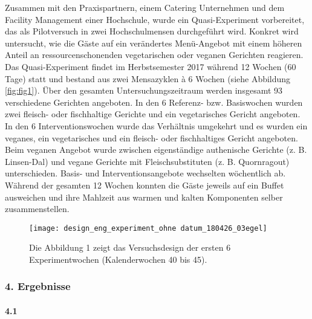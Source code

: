 \documentclass[12pt,ngerman,]{article}
\let\oldparagraph\paragraph
\renewcommand{\paragraph}[1]{\oldparagraph{#1}\mbox{}}
\begin{document}
Zusammen mit den Praxispartnern, einem Catering Unternehmen und dem
Facility Management einer Hochschule, wurde ein Quasi-Experiment
vorbereitet, das als Pilotversuch in zwei Hochschulmensen durchgeführt
wird. Konkret wird untersucht, wie die Gäste auf ein verändertes
Menü-Angebot mit einem höheren Anteil an ressourcenschonenden
vegetarischen oder veganen Gerichten reagieren. Das Quasi-Experiment
findet im Herbstsemester 2017 während 12 Wochen (60 Tage) statt und
bestand aus zwei Mensazyklen à 6 Wochen (siehe Abbildung
\ref{fig:fig1}). Über den gesamten Untersuchungszeitraum werden
insgesamt 93 verschiedene Gerichten angeboten. In den 6 Referenz- bzw.
Basiswochen wurden zwei fleisch- oder fischhaltige Gerichte und ein
vegetarisches Gericht angeboten. In den 6 Interventionswochen wurde das
Verhältnis umgekehrt und es wurden ein veganes, ein vegetarisches und
ein fleisch- oder fischhaltiges Gericht angeboten. Beim veganen Angebot
wurde zwischen eigenständige authenische Gerichte (z. B. Linsen-Dal) und
vegane Gerichte mit Fleischsubstituten (z. B. Quornragout)
unterschieden. Basis- und Interventionsangebote wechselten wöchentlich
ab. Während der gesamten 12 Wochen konnten die Gäste jeweils auf ein
Buffet ausweichen und ihre Mahlzeit aus warmen und kalten Komponenten
selber zusammenstellen.

\begin{figure}
\texttt{[image: design\_eng\_experiment\_ohne datum\_180426\_03egel]} \caption{\label{fig:fig1} Die Abbildung 1 zeigt das Versuchsdesign der ersten 6 Experimentwochen (Kalenderwochen 40 bis 45).}\label{fig:unnamed-chunk-1}
\end{figure}

\hypertarget{ergebnisse}{%
\subsubsection{4. Ergebnisse}\label{ergebnisse}}

\hypertarget{section}{%
\paragraph{4.1}\label{section}}
\end{document}
